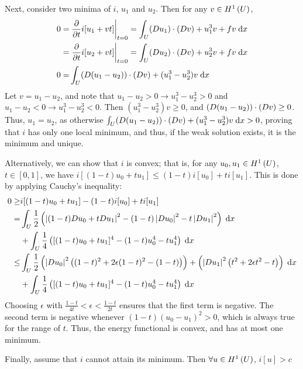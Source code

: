 Next, consider two minima of $i$, $u_1$ and $u_2$.
Then for any $v \in H^{1}\left(U \right)$,
\begin{align*}
  0 = &\left. \frac{\partial }{\partial t} i[u_1 + v t] \right\rvert_{t = 0}
    = \int_U (D u_1) \cdot (D v) + u_1^3 v + f v \;\mathrm{d}x\\
    = &\left. \frac{\partial }{\partial t} i[u_2 + v t] \right\rvert_{t = 0}
    = \int_U (D u_2) \cdot (D v) + u_2^3 v + f v \;\mathrm{d}x\\
  0 = &\int_U (D (u_1 - u_2)) \cdot (D v) + (u_1^3 - u_2^3) v \;\mathrm{d}x
\end{align*}
Let $v = u_1 - u_2$, and note that $u_1 - u_2 > 0 \rightarrow u_1^3 - u_2^3 > 0$
and $u_1 - u_2 < 0 \rightarrow u_1^3 - u_2^3 < 0$.
Then $(u_1^3 - u_2^3) v \geq 0$, and $(D (u_1 - u_2)) \cdot (D v) \geq 0$.
Thus, $u_1 = u_2$, as otherwise
$\int_U (D (u_1 - u_2)) \cdot (D v) + (u_1^3 - u_2^3) v \;\mathrm{d}x > 0$,
proving that $i$ has only one local minimum, and thus,
if the weak solution exists, it is the minimum and unique.

Alternatively, we can show that $i$ is convex; that is, for any $u_0, u_1 \in H^{1}\left(U \right)$,
$t \in [0, 1]$, we have $i[(1 - t) u_0 + t u_1] \leq (1 - t) i[u_0] + t i[u_1]$.
This is done by applying Cauchy's inequality:
\begin{align*}
 0 \geq &i[(1 - t) u_0 + t u_1] - (1 - t) i[u_0] + t i[u_1]\\
   = &\int_{U} \frac{1}{2} \left(
         \left\lvert (1 - t) D u_0 + t D u_1 \right \rvert^2
           - (1 - t) \left\lvert D u_0 \right\rvert^2
           - t \left\lvert D u_1 \right\rvert^2 \right) \;\mathrm{d}x\\
     &+ \int_{U} \frac{1}{4} \left(
         [(1 - t) u_0 + t u_1]^4
         - (1 - t) u_0^4 - t u_1^4 \right) \;\mathrm{d}x\\
   \leq &\int_{U} \frac{1}{2}
           \left(\left\lvert D u_0 \right\rvert^2 \left( (1 - t)^2 + 2 \epsilon (1 - t)^2 - (1 - t) \right) \right)
           + \left(\left\lvert D u_1 \right\rvert^2 \left( t^2 + 2 \epsilon t^2 - t \right) \right) \;\mathrm{d}x\\
        &+ \int_{U} \frac{1}{4} \left(
          [(1 - t) u_0 + t u_1]^4 - (1 - t) u_0^4 - t u_1^4 \right) \;\mathrm{d}x\\
\end{align*}
Choosing $\epsilon$ with $\frac{1 - t}{4 t} < \epsilon < \frac{1 - t}{2 t}$
ensures that the first term is negative.
The second term is negative whenever $(1 - t) (u_0 - u_1)^2 > 0$, which is always true for the range of $t$.
Thus, the energy functional is convex, and has at most one minimum.

Finally, assume that $i$ cannot attain its minimum.
Then $\forall u \in H^{1}\left(U \right)$,
$i[u] > c$
